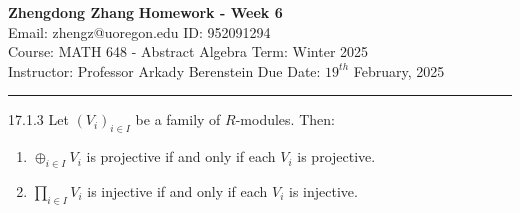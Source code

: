 \documentclass[a4paper, 12pt]{article}
\begin{document}
\noindent
\large\textbf{Zhengdong Zhang} \hfill \textbf{Homework - Week 6}   \\
Email: zhengz@uoregon.edu \hfill ID: 952091294 \\
\normalsize Course: MATH 648 - Abstract Algebra  \hfill Term: Winter 2025\\
Instructor: Professor Arkady Berenstein \hfill Due Date: $19^{th}$ February, 2025 \\
\noindent\rule{7in}{2.8pt}
\begin{problem}{17.1.3}
Let \((V_i)_{i\in I}\) be a family of \(R\)-modules. Then:
\begin{enumerate}[(1)]
\item \(\oplus_{i\in I}V_i\) is projective if and only if each \(V_i\) is projective. 
\item \(\prod_{i\in I}V_i\) is injective if and only if each \(V_i\) is injective. 
\end{enumerate}
\end{problem}
\end{document}
